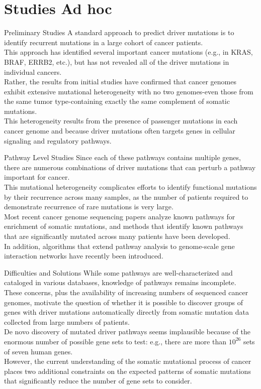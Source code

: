 \documentclass[xcolor=dvipsnames]{beamer}
\begin{document}
\section{Studies Ad hoc}
\begin{frame}{Preliminary Studies}
A standard approach to predict driver mutations is to identify recurrent mutations in a large cohort of cancer patients.\\
This approach has identified several important cancer mutations (e.g., in KRAS, BRAF, ERRB2, etc.), but has not revealed all of the driver mutations in individual cancers.\\
Rather, the results from initial studies have confirmed that cancer genomes exhibit extensive mutational heterogeneity with no two genomes-even those from the same tumor type-containing exactly the same complement of somatic mutations.\\
This heterogeneity results from the presence of passenger mutations in each cancer genome and because driver mutations often targets genes in cellular signaling and regulatory pathways.\\
\end{frame}
\begin{frame}{Pathway Level Studies}
Since each of these pathways contains multiple genes, there are numerous combinations of driver mutations that can perturb a pathway important for cancer.\\
This mutational heterogeneity complicates efforts to identify functional mutations by their recurrence across many samples, as the number of patients required to demonstrate recurrence of rare mutations is very large.\\
Most recent cancer genome sequencing papers analyze known pathways for enrichment of somatic mutations, and methods that identify known pathways that are significantly mutated across many patients have been developed.\\
In addition, algorithms that extend pathway analysis to genome-scale gene interaction networks have recently been introduced.\\
\end{frame}
\begin{frame}{Difficulties and Solutions}
While some pathways are well-characterized and cataloged in various databases, knowledge of pathways remains incomplete.\\
These concerns, plus the availability of increasing numbers of sequenced cancer genomes, motivate the question of whether it is possible to discover groups of genes with driver mutations automatically directly from somatic mutation data collected from large numbers of patients.\\
De novo discovery of mutated driver pathways seems implausible because of the enormous number of possible gene sets to test: e.g., there are more than $10^{26}$ sets of seven human genes.\\
However, the current understanding of the somatic mutational process of cancer places two additional constraints on the expected patterns of somatic mutations that significantly reduce the number of gene sets to consider.\\
\end{frame}
\end{document}
